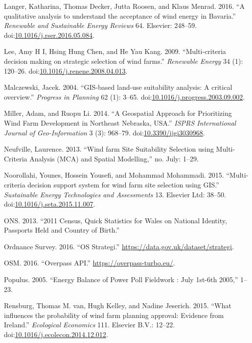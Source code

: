 \documentclass[a4paper,]{article}
\theoremstyle{definition}
\theoremstyle{definition}
\theoremstyle{remark}
\begin{document}
{\hypertarget{ref-Langer2016a}{}
Langer, Katharina, Thomas Decker, Jutta Roosen, and Klaus Menrad. 2016.
``A qualitative analysis to understand the acceptance of wind energy in
Bavaria.'' \emph{Renewable and Sustainable Energy Reviews} 64. Elsevier:
248--59.
doi:\href{https://doi.org/10.1016/j.rser.2016.05.084}{10.1016/j.rser.2016.05.084}.

\hypertarget{ref-Lee2009}{}
Lee, Amy H I, Hsing Hung Chen, and He Yau Kang. 2009. ``Multi-criteria
decision making on strategic selection of wind farms.'' \emph{Renewable
Energy} 34 (1): 120--26.
doi:\href{https://doi.org/10.1016/j.renene.2008.04.013}{10.1016/j.renene.2008.04.013}.

\hypertarget{ref-Malczewski2004}{}
Malczewski, Jacek. 2004. ``GIS-based land-use suitability analysis: A
critical overview.'' \emph{Progress in Planning} 62 (1): 3--65.
doi:\href{https://doi.org/10.1016/j.progress.2003.09.002}{10.1016/j.progress.2003.09.002}.

\hypertarget{ref-Miller2014}{}
Miller, Adam, and Ruopu Li. 2014. ``A Geospatial Approach for
Prioritizing Wind Farm Development in Northeast Nebraska, USA.''
\emph{ISPRS International Journal of Geo-Information} 3 (3): 968--79.
doi:\href{https://doi.org/10.3390/ijgi3030968}{10.3390/ijgi3030968}.

\hypertarget{ref-Neufville2013}{}
Neufville, Laurence. 2013. ``Wind farm Site Suitability Selection using
Multi-Criteria Analysis (MCA) and Spatial Modelling,'' no. July: 1--29.

\hypertarget{ref-Noorollahi2015}{}
Noorollahi, Younes, Hossein Yousefi, and Mohammad Mohammadi. 2015.
``Multi-criteria decision support system for wind farm site selection
using GIS.'' \emph{Sustainable Energy Technologies and Assessments} 13.
Elsevier Ltd: 38--50.
doi:\href{https://doi.org/10.1016/j.seta.2015.11.007}{10.1016/j.seta.2015.11.007}.

\hypertarget{ref-ONS2013}{}
ONS. 2013. ``2011 Census, Quick Statistics for Wales on National
Identity, Passports Held and Country of Birth.''

\hypertarget{ref-Survey2016}{}
Ordnance Survey. 2016. ``OS Strategi.''
\url{https://data.gov.uk/dataset/strategi}.

\hypertarget{ref-Overpass2016}{}
OSM. 2016. ``Overpass API.'' \url{https://overpass-turbo.eu/}.

\hypertarget{ref-Populus2005}{}
Populus. 2005. ``Energy Balance of Power Poll Fieldwork : July 1st-6th
2005,'' 1--23.

\hypertarget{ref-VanRensburg20}{}
Rensburg, Thomas M. van, Hugh Kelley, and Nadine Jeserich. 2015. ``What
influences the probability of wind farm planning approval: Evidence from
Ireland.'' \emph{Ecological Economics} 111. Elsevier B.V.: 12--22.
doi:\href{https://doi.org/10.1016/j.ecolecon.2014.12.012}{10.1016/j.ecolecon.2014.12.012}.

}
\end{document}
